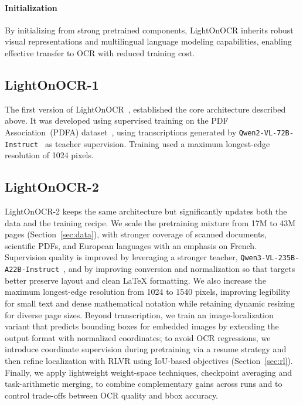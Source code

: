 \documentclass{article}
\begin{document}
\paragraph{Initialization}
By initializing from strong pretrained components, LightOnOCR inherits robust visual representations and multilingual language modeling capabilities, enabling effective transfer to OCR with reduced training cost.


\subsection{LightOnOCR-1}
The first version of LightOnOCR~\cite{blogpostv1}, established the core architecture described above. It was developed using supervised training on the PDF Association~(PDFA) dataset~\cite{pixparse_pdfa_eng_wds}, using transcriptions generated by \texttt{Qwen2-VL-72B-Instruct}~\cite{Qwen2VL} as teacher supervision. Training used a maximum longest-edge resolution of 1024 pixels.

\subsection{LightOnOCR-2}
\label{sec:overview_v2}
LightOnOCR-2 keeps the same architecture but significantly updates both the data and the training recipe. We scale the pretraining mixture from 17M to 43M pages (Section~\ref{sec:data}), with stronger coverage of scanned documents, scientific PDFs, and European languages with an emphasis on French. Supervision quality is improved by leveraging a stronger teacher, \texttt{Qwen3-VL-235B-A22B-Instruct}~\cite{qwen3technicalreport}, and by improving conversion and normalization so that targets better preserve layout and clean \LaTeX{} formatting. We also increase the maximum longest-edge resolution from 1024 to 1540 pixels, improving legibility for small text and dense mathematical notation while retaining dynamic resizing for diverse page sizes. Beyond transcription, we train an image-localization variant that predicts bounding boxes for embedded images by extending the output format with normalized coordinates; to avoid OCR regressions, we introduce coordinate supervision during pretraining via a resume strategy and then refine localization with RLVR using IoU-based objectives (Section~\ref{sec:rl}). Finally, we apply lightweight weight-space techniques, checkpoint averaging and task-arithmetic merging, to combine complementary gains across runs and to control trade-offs between OCR quality and bbox accuracy.
\end{document}
